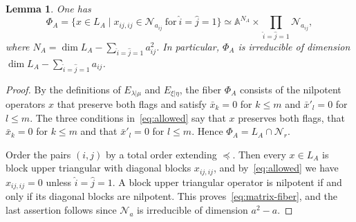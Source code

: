 \documentclass[11pt,a4paper]{amsart}
\newtheorem{lemma}[theorem]{Lemma}
\theoremstyle{definition}
\theoremstyle{remark}
\newcommand{\N}{\mathcal N}
\newcommand{\lm}{\lambda|\mu}
\newcommand{\xh}{\xi|\eta}
\numberwithin{equation}{section}
\begin{document}
\begin{lemma}\label{lem:fiber}
One has
\begin{equation}\label{eq:matrix-fiber}
\Phi_A=\{x\in L_A\mid x_{ij,ij}\in\N_{a_{ij}}\ \text{for}\
\widehat i=\widehat j=1\}
\simeq\mathbb A^{N_A}\times\prod_{\widehat i=\widehat j=1}\N_{a_{ij}},
\end{equation}
where $N_A=\dim L_A-\sum_{\widehat i=\widehat j=1}a_{ij}^2$. In
particular, $\Phi_A$ is irreducible of dimension
$\dim L_A-\sum_{\widehat i=\widehat j=1}a_{ij}$.
\end{lemma}
\begin{proof}
By the definitions of $E_{\lm}$ and $E_{\xh}$, the fiber $\Phi_A$
consists of the nilpotent operators $x$ that preserve both flags and
satisfy $\bar x_k=0$ for $k\leq m$ and $\bar x'_l=0$ for $l\leq m$. The three
conditions in~\eqref{eq:allowed} say that $x$ preserves both flags, that
$\bar x_k=0$ for $k\leq m$ and that $\bar x'_l=0$ for $l\leq m$. Hence
$\Phi_A=L_A\cap\N_r$.

Order the pairs $(i,j)$ by a total order extending $\preceq$. Then every
$x\in L_A$ is block upper triangular with diagonal blocks $x_{ij,ij}$,
and by~\eqref{eq:allowed} we have $x_{ij,ij}=0$ unless
$\widehat i=\widehat j=1$. A block upper triangular operator is nilpotent
if and only if its diagonal blocks are nilpotent. This
proves~\eqref{eq:matrix-fiber}, and the last assertion follows since
$\N_a$ is irreducible of dimension $a^2-a$.
\end{proof}
\end{document}
